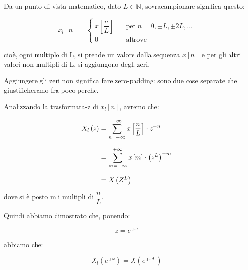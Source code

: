 Da un punto di vista matematico, dato $L \in \mathbb{N}$, sovracampionare significa questo: 

{
    \Large 
    \begin{equation}
        x_{l} \left[ n\right]
        = 
        \begin{cases}
            x \left[ \dfrac{n}{L}\right] &\quad \text{per } n = 0, \pm L, \pm 2L, \dots 
            \\
            0 &\quad \text{altrove }
        \end{cases}
    \end{equation}
}

cioè, ogni multiplo di L, si prende un valore dalla sequenza $x \left[ n\right]$ e per gli altri valori non multipli di L, si aggiungono degli zeri. \newline 

Aggiungere gli zeri non significa fare zero-padding: sono due cose separate che giustificheremo fra poco perchè. \newline 

Analizzando la trasformata-z di $x_{l} \left[ n\right]$, avremo che: 

{
    \Large 
    \begin{equation}
        \setlength{\jot}{10pt} %
        \begin{split}
            X_{l} \left(z\right)
            &= 
            \sum_{n = -\infty}^{+ \infty}
            x \left[ \dfrac{n}{L}\right]
            \cdot 
            z^{-n}
            \\
            &= 
            \sum_{m = -\infty}^{+ \infty}
            x \left[m\right]
            \cdot
            \left(
                z^{L}
            \right)^{-m} 
            \\
            &= 
            X \left(Z^{L}\right)
        \end{split}
    \end{equation}
}

dove si è posto m i multipli di $\dfrac{n}{L}$. \newline 

Quindi abbiamo dimostrato che, ponendo: 

{
    \Large 
    \begin{equation}
        z = e^{\jmath \omega}
    \end{equation}
}

abbiamo che: 

{
    \Large 
    \begin{equation}
        X_{l} \left(e^{\jmath \omega}\right)
        = 
        X \left(e^{\jmath \omega L}\right)
    \end{equation}
}

